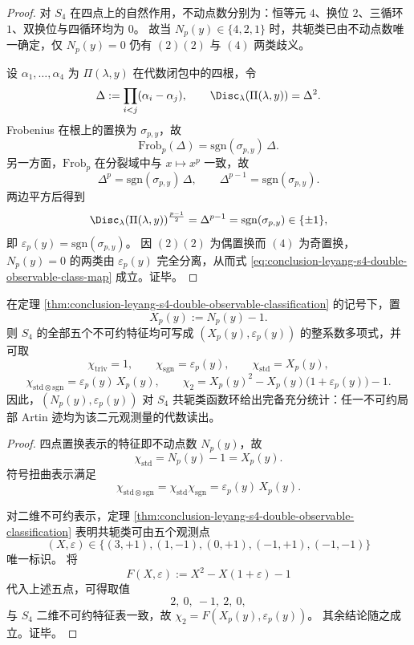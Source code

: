 \begin{proof}
对 \(S_4\) 在四点上的自然作用，不动点数分别为：恒等元 \(4\)、换位 \(2\)、三循环 \(1\)、双换位与四循环均为 \(0\)。
故当 \(N_p(y)\in\{4,2,1\}\) 时，共轭类已由不动点数唯一确定，仅 \(N_p(y)=0\) 仍有 \((2)(2)\) 与 \((4)\) 两类歧义。

设 \(\alpha_1,\dots,\alpha_4\) 为 \(\Pi(\lambda,y)\) 在代数闭包中的四根，令
\[
\Delta:=\prod_{i<j}(\alpha_i-\alpha_j),\qquad
\Disc_\lambda(\Pi(\lambda,y))=\Delta^2.
\]
Frobenius 在根上的置换为 \(\sigma_{p,y}\)，故
\[
\mathrm{Frob}_p(\Delta)=\mathrm{sgn}(\sigma_{p,y})\,\Delta.
\]
另一方面，\(\mathrm{Frob}_p\) 在分裂域中与 \(x\mapsto x^p\) 一致，故
\[
\Delta^p=\mathrm{sgn}(\sigma_{p,y})\,\Delta,\qquad
\Delta^{p-1}=\mathrm{sgn}(\sigma_{p,y}).
\]
两边平方后得到
\[
\Disc_\lambda(\Pi(\lambda,y))^{\frac{p-1}{2}}
=\Delta^{p-1}
=\mathrm{sgn}(\sigma_{p,y})\in\{\pm1\},
\]
即 \(\varepsilon_p(y)=\mathrm{sgn}(\sigma_{p,y})\)。
因 \((2)(2)\) 为偶置换而 \((4)\) 为奇置换，\(N_p(y)=0\) 的两类由 \(\varepsilon_p(y)\) 完全分离，从而式 \eqref{eq:conclusion-leyang-s4-double-observable-class-map} 成立。证毕。
\end{proof}

\begin{theorem}\label{thm:conclusion-leyang-s4-character-polynomial-observable}
在定理 \ref{thm:conclusion-leyang-s4-double-observable-classification} 的记号下，置
\[
X_p(y):=N_p(y)-1.
\]
则 \(S_4\) 的全部五个不可约特征均可写成 \((X_p(y),\varepsilon_p(y))\) 的整系数多项式，并可取
\[
\chi_{\mathrm{triv}}=1,\qquad
\chi_{\mathrm{sgn}}=\varepsilon_p(y),\qquad
\chi_{\mathrm{std}}=X_p(y),
\]
\[
\chi_{\mathrm{std}\otimes\mathrm{sgn}}
=\varepsilon_p(y)\,X_p(y),
\qquad
\chi_{2}
=X_p(y)^2-X_p(y)\bigl(1+\varepsilon_p(y)\bigr)-1.
\]
因此，\((N_p(y),\varepsilon_p(y))\) 对 \(S_4\) 共轭类函数环给出完备充分统计：任一不可约局部 Artin 迹均为该二元观测量的代数读出。
\end{theorem}
\begin{proof}
四点置换表示的特征即不动点数 \(N_p(y)\)，故
\[
\chi_{\mathrm{std}}=N_p(y)-1=X_p(y).
\]
符号扭曲表示满足
\[
\chi_{\mathrm{std}\otimes\mathrm{sgn}}
=\chi_{\mathrm{std}}\chi_{\mathrm{sgn}}
=\varepsilon_p(y)\,X_p(y).
\]

对二维不可约表示，定理 \ref{thm:conclusion-leyang-s4-double-observable-classification} 表明共轭类可由五个观测点
\[
(X,\varepsilon)\in
\{(3,+1),(1,-1),(0,+1),(-1,+1),(-1,-1)\}
\]
唯一标识。
将
\[
F(X,\varepsilon):=X^2-X(1+\varepsilon)-1
\]
代入上述五点，可得取值
\[
2,\ 0,\ -1,\ 2,\ 0,
\]
与 \(S_4\) 二维不可约特征表一致，故 \(\chi_2=F(X_p(y),\varepsilon_p(y))\)。
其余结论随之成立。证毕。
\end{proof}

